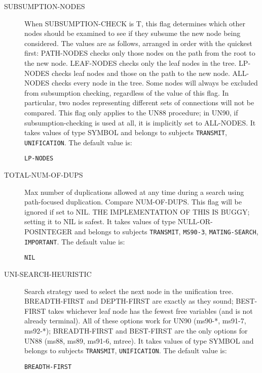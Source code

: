 \begin{description}
\item[SUBSUMPTION-NODES]  
When SUBSUMPTION-CHECK is T, this flag determines
which other nodes should be examined to see if they subsume the
new node being considered. The values are as follows, arranged
in order with the quickest first:
PATH-NODES checks only those nodes on the path from the root to
  the new node.
LEAF-NODES checks only the leaf nodes in the tree.
LP-NODES checks leaf nodes and those on the path to the
  new node.
ALL-NODES checks every node in the tree.
Some nodes will always be excluded from subsumption checking,
regardless of the value of this flag. In particular, two nodes
representing different sets of connections will not be 
compared. 
This flag only applies to the UN88 procedure; in UN90, if
subsumption-checking is used at all, it is implicitly
set to ALL-NODES.
It takes values of type SYMBOL and belongs to subjects \texttt{TRANSMIT}, \texttt{UNIFICATION}.  The default value is: \begin{lstlisting}
LP-NODES
\end{lstlisting}

\item[TOTAL-NUM-OF-DUPS]  
Max number of duplications allowed at any time 
during a search using path-focused duplication. Compare
NUM-OF-DUPS. This flag will be ignored if set to NIL.
THE IMPLEMENTATION OF THIS IS BUGGY; setting it to NIL is safest.
It takes values of type NULL-OR-POSINTEGER and belongs to subjects \texttt{TRANSMIT}, \texttt{MS90-3}, \texttt{MATING-SEARCH}, \texttt{IMPORTANT}.  The default value is: \begin{lstlisting}
NIL
\end{lstlisting}

\item[UNI-SEARCH-HEURISTIC]  
Search strategy used to select the next node in the unification tree.
BREADTH-FIRST and DEPTH-FIRST are exactly as they sound;
BEST-FIRST takes whichever leaf node has the fewest free
variables (and is not already terminal).
All of these options work for UN90 (ms90-*, ms91-7, ms92-*);
BREADTH-FIRST and BEST-FIRST are the only options for UN88 (ms88, ms89, 
ms91-6, mtree).
It takes values of type SYMBOL and belongs to subjects \texttt{TRANSMIT}, \texttt{UNIFICATION}.  The default value is: \begin{lstlisting}
BREADTH-FIRST
\end{lstlisting}


\end{description}
